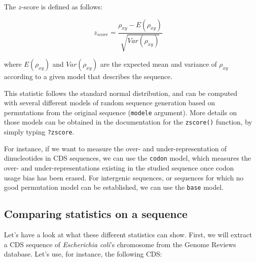 \documentclass{article}
\begin{document}
The $z$-score is defined as follows:

$$z_{score}=\frac{\rho_{xy}-E(\rho_{xy})}{\sqrt{Var(\rho_{xy})}}$$

where $E(\rho_{xy})$ and $Var(\rho_{xy})$ are the expected mean and
variance of $\rho_{xy}$ according to a given model that describes the
sequence.

This statistic follows the standard normal distribution, and can be
computed with several different models of random sequence generation
based on permutations from the original sequence (\texttt{modele}
argument). More details on those models can be obtained in the
documentation for the \texttt{zscore()} function, by simply typing
\texttt{?zscore}.

For instance, if we want to measure the over- and under-representation
of dinucleotides in CDS sequences, we can use the \texttt{codon}
model, which measures the over- and under-representations existing in
the studied sequence once codon usage bias has been erased. For
intergenic sequences, or sequences for which no good permutation model
can be established, we can use the \texttt{base} model. 

\subsection{Comparing statistics on a sequence}

Let's have a look at what these different statistics can show. First,
we will extract a CDS sequence of \textit{Escherichia coli}'s
chromosome from the Genome Reviews database. Let's use, for instance, 
the following CDS:
\end{document}
